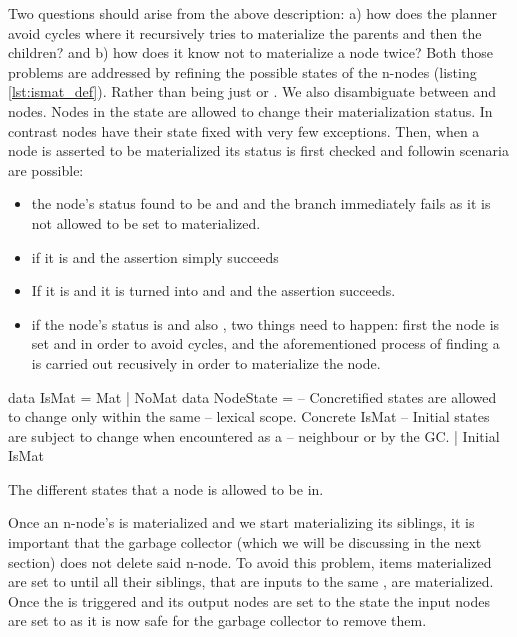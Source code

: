 Two questions should arise from the above description: a) how does the
planner avoid cycles where it recursively tries to materialize the
parents and then the children? and b) how does it know not to
materialize a node twice? Both those problems are addressed by
refining the possible states of the n-nodes (listing
\ref{lst:ismat_def}). Rather than being just  or
. We also disambiguate between  and
 nodes. Nodes in the  state are allowed
to change their materialization status. In contrast 
nodes have their state fixed with very few exceptions. Then, when a
node is asserted to be materialized its status is first checked and
followin scenaria are possible:

\begin{itemize}
\item the node's status found to be  and 
  and the branch immediately fails as it is not allowed to be set to
  materialized.
\item if it is  and  the assertion simply
  succeeds
\item If it is  and  it is turned into
   and  and the assertion succeeds.
\item if the node's status is  and also ,
  two things need to happen: first the node is set  and
   in order to avoid cycles, and the aforementioned
  process of finding a  is carried out recusively in
  order to materialize the node.
\end{itemize}

\begin{code}
\begin{haskellcode}
data IsMat = Mat | NoMat
data NodeState =
  -- Concretified states are allowed to change only within the same
  -- lexical scope.
  Concrete IsMat
  -- Initial states are subject to change when encountered as a
  -- neighbour or by the GC.
  | Initial IsMat
\end{haskellcode}
  \caption{\label{lst:ismat_def}The different states that a node is
    allowed to be in.}
\end{code}


Once an n-node's is materialized and we start materializing its
siblings, it is important that the garbage collector (which we will be
discussing in the next section) does not delete said n-node.  To avoid
this problem, items materialized are set to  until all
their siblings, that are inputs to the same , are
materialized. Once the  is triggered and its output nodes are
set to the  state the input nodes are set to  as it is now safe for the garbage collector to remove them.

